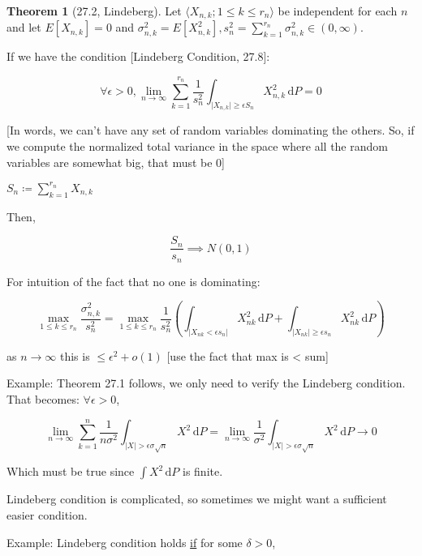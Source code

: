 \documentclass{article}
\theoremstyle{definition}
\newtheorem{theorem}{Theorem}
\begin{document}
\begin{theorem}
    [27.2, Lindeberg]

    Let \(\langle X_{n,k}; 1 \leq k \leq r_n \rangle \) be independent for each \(n\) and let \(E[X_{n,k}] = 0\) and \(\sigma_{n,k}^2 = E[X_{n,k}^2], s_n^2 = \sum_{k=1}^{r_n} \sigma_{n,k}^2 \in (0,\infty)\).
    
    If we have the condition [Lindeberg Condition, 27.8]:

    \[
        \forall \epsilon >0, \lim_{n \to \infty} \sum_{k=1}^{r_n} \frac{1}{s_n^2} \int_{\vert X_{n,k} \vert \geq \epsilon S_n}^{} X_{n,k}^2 \,\mathrm{d}P = 0
    \]
    
    [In words, we can't have any set of random variables dominating the others. So, if we compute the normalized total variance in the space where all the random variables are somewhat big, that must be 0]
    
    \(S_n \coloneqq \sum_{k=1}^{r_n} X_{n,k}\)

    Then,

    \[
        \frac{S_n}{s_n} \implies N(0,1)
    \]

\end{theorem}

For intuition of the fact that no one is dominating:

\[
    \max_{1 \leq k \leq r_n} \frac{\sigma_{n,k}^2}{s_n^2} = \max_{1\leq k\leq r_n} \frac{1}{s_n^2} \left( \int_{\vert X_{nk} < \epsilon s_n \vert }^{} X_{nk}^2 \,\mathrm{d}P + \int_{\vert X_{nk} \vert \geq \epsilon s_n}^{} X_{nk}^2 \,\mathrm{d}P   \right) 
\] 

as \(n\to \infty\) this is \(\leq \epsilon^2 + o(1)\) [use the fact that max is < sum]

Example: Theorem 27.1 follows, we only need to verify the Lindeberg condition. That becomes: \(\forall \epsilon >0\),

\[
    \lim_{n \to \infty} \sum_{k=1}^{n} \frac{1}{n \sigma ^2} \int_{\vert X \vert > \epsilon \sigma \sqrt{n} }^{} X^2 \,\mathrm{d}P = \lim_{n \to \infty} \frac{1}{\sigma^2}\int_{\vert X \vert > \epsilon \sigma \sqrt{n} }^{} X^2 \,\mathrm{d}P \to 0
\]

Which must be true since \(\int X^2\,\mathrm{d} P\) is finite.

Lindeberg condition is complicated, so sometimes we might want a sufficient easier condition.

Example: Lindeberg condition holds \underline{if} for some \(\delta > 0\),
\end{document}
